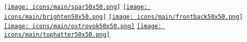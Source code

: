 \documentclass[]{plushcv}
\begin{document}
\begin{minipage}[t]{0.74\textwidth}
\href{https://getspar.com}{\texttt{[image: icons/main/spar50x50.png]}}\hspace{0.3cm}
\href{https://www.nytimes.com/2016/12/20/fashion/austin-kevitch-brighten-app-anti-bullying.html}{\texttt{[image: icons/main/brighten50x50.png]}}\hspace{0.3cm}
\href{https://www.businessinsider.com/frontback-the-once-hot-startup-that-rejected-a-40-million-twitter-acquisition-is-back-from-the-dead-2015-7}{\texttt{[image: icons/main/frontback50x50.png]}}\hspace{0.3cm}
\href{https://apps.apple.com/us/app/ostrovok-ru-hotel-deals/id564204730}{\texttt{[image: icons/main/ostrovok50x50.png]}}\hspace{0.3cm}
\href{https://tophatter.com}{\texttt{[image: icons/main/tophatter50x50.png]}}




\end{minipage} 
\hfill
\end{document}

